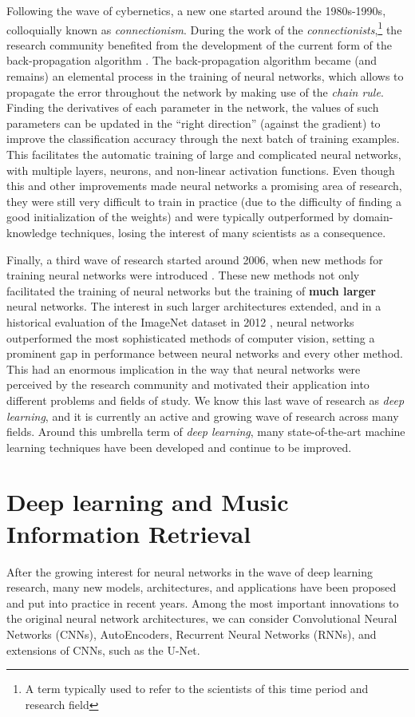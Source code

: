 Following the wave of cybernetics, a new one started around the 1980s-1990s, colloquially known as \emph{connectionism}. During the work of the \emph{connectionists},\footnote{A term typically used to refer to the scientists of this time period and research field} the research community benefited from the development of the current form of the back-propagation algorithm \cite{rumelhart_learning_1988}. The back-propagation algorithm became (and remains) an elemental process in the training of neural networks, which allows to propagate the error throughout the network by making use of the \emph{chain rule}. Finding the derivatives of each parameter in the network, the values of such parameters can be updated in the ``right direction'' (against the gradient) to improve the classification accuracy through the next batch of training examples. This facilitates the automatic training of large and complicated neural networks, with multiple layers, neurons, and non-linear activation functions. Even though this and other improvements made neural networks a promising area of research, they were still very difficult to train in practice (due to the difficulty of finding a good initialization of the weights) and were typically outperformed by domain-knowledge techniques, losing the interest of many scientists as a consequence.

Finally, a third wave of research started around 2006, when new methods for training neural networks were introduced \cite{hinton_fast_2006}. These new methods not only facilitated the training of neural networks but the training of \textbf{much larger} neural networks. The interest in such larger architectures extended, and in a historical evaluation of the ImageNet dataset in 2012 \cite{krizhevsky_imagenet_2012}, neural networks outperformed the most sophisticated methods of computer vision, setting a prominent gap in performance between neural networks and every other method. This had an enormous implication in the way that neural networks were perceived by the research community and motivated their application into different problems and fields of study. We know this last wave of research as \emph{deep learning}, and it is currently an active and growing wave of research across many fields. Around this umbrella term of \emph{deep learning}, many state-of-the-art machine learning techniques have been developed and continue to be improved.

\section{Deep learning and Music Information Retrieval}
After the growing interest for neural networks in the wave of deep learning research, many new models, architectures, and applications have been proposed and put into practice in recent years.
Among the most important innovations to the original neural network architectures, we can consider Convolutional Neural Networks (CNNs), AutoEncoders, Recurrent Neural Networks (RNNs), and extensions of CNNs, such as the U-Net.

